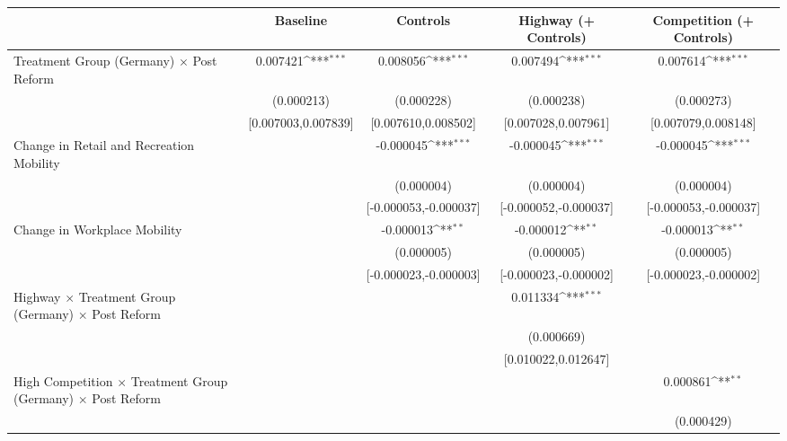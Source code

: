 {
\def\sym#1{\ifmmode^{#1}\else\(^{#1}\)\fi}
\begin{tabular}{l*{4}{c}}
\toprule
                    &\multicolumn{1}{c}{Baseline}&\multicolumn{1}{c}{Controls}&\multicolumn{1}{c}{Highway (+ Controls)}&\multicolumn{1}{c}{Competition (+ Controls)}\\
\midrule
Treatment Group (Germany) $\times$ Post Reform&    0.007421\sym{***}&    0.008056\sym{***}&    0.007494\sym{***}&    0.007614\sym{***}\\
                    &  (0.000213)         &  (0.000228)         &  (0.000238)         &  (0.000273)         \\
                    &[0.007003,0.007839]         &[0.007610,0.008502]         &[0.007028,0.007961]         &[0.007079,0.008148]         \\
Change in Retail and Recreation Mobility&                     &   -0.000045\sym{***}&   -0.000045\sym{***}&   -0.000045\sym{***}\\
                    &                     &  (0.000004)         &  (0.000004)         &  (0.000004)         \\
                    &                     &[-0.000053,-0.000037]         &[-0.000052,-0.000037]         &[-0.000053,-0.000037]         \\
Change in Workplace Mobility&                     &   -0.000013\sym{**} &   -0.000012\sym{**} &   -0.000013\sym{**} \\
                    &                     &  (0.000005)         &  (0.000005)         &  (0.000005)         \\
                    &                     &[-0.000023,-0.000003]         &[-0.000023,-0.000002]         &[-0.000023,-0.000002]         \\
Highway $\times$ Treatment Group (Germany) $\times$ Post Reform&                     &                     &    0.011334\sym{***}&                     \\
                    &                     &                     &  (0.000669)         &                     \\
                    &                     &                     &[0.010022,0.012647]         &                     \\
High Competition $\times$ Treatment Group (Germany) $\times$ Post Reform&                     &                     &                     &    0.000861\sym{**} \\
                    &                     &                     &                     &  (0.000429)         \\

\end{tabular}}
